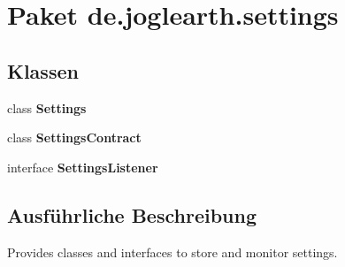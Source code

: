 \section{Paket de.\-joglearth.\-settings}
\label{namespacede_1_1joglearth_1_1settings}
\subsection*{Klassen}
\begin{DoxyCompactItemize}
\item 
class {\bf Settings}
\item 
class {\bf Settings\-Contract}
\item 
interface {\bf Settings\-Listener}
\end{DoxyCompactItemize}


\subsection{Ausführliche Beschreibung}
Provides classes and interfaces to store and monitor settings. 